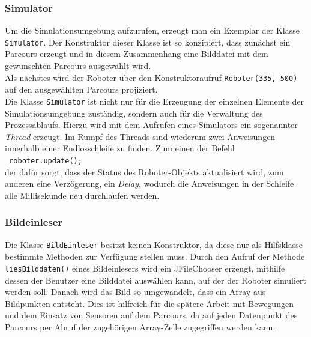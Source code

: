 \documentclass[paper=a4, DIV=calc, BCOR=12mm, twoside=on, onecolumn=on, open = right, titlepage =on, parskip =half-, headsepline = on, footsepline = off, chapterprefix = off, appendixprefix = on, fontsize = 12pt, numbers = noenddot, abstract = on]{scrbook}
\begin{document}
\vspace*{-2ex}
\subsubsection{Simulator}

Um die Simulationsumgebung aufzurufen, erzeugt man ein Exemplar der Klasse \texttt{Si\-mu\-la\-tor}. Der Konstruktor dieser Klasse ist so konzipiert, dass zunächst ein Parcours erzeugt und in diesem Zusammenhang eine Bilddatei mit dem gewünschten Parcours ausgewählt wird.\\
Als nächstes wird der Roboter über den Konstruktoraufruf \texttt{Roboter(335, 500)} auf den ausgewählten Parcours projiziert.\\
Die Klasse \texttt{Simulator} ist nicht nur für die Erzeugung der einzelnen Elemente der Simulationsumgebung zuständig, sondern auch für die Verwaltung des Prozessablaufs. Hierzu wird mit dem Aufrufen eines Simulators ein sogenannter \emph{Thread} erzeugt. Im Rumpf des Threads sind wiederum zwei Anweisungen innerhalb einer Endlosschleife zu finden. Zum einen der Befehl\\
\hspace*{2em} \texttt{{\_}roboter.update();}\\
der dafür sorgt, dass der Status des Roboter-Objekts aktualisiert wird, zum anderen eine Verzögerung, ein \emph{Delay}, wodurch die Anweisungen in der Schleife alle Millisekunde neu durchlaufen werden. 


\subsubsection{Bildeinleser}
Die Klasse \texttt{BildEinleser} besitzt keinen Konstruktor, da diese nur als Hilfsklasse bestimmte Methoden zur Verfügung stellen muss. Durch den Aufruf der Methode\\
\texttt{liesBilddaten()} eines Bildeinlesers wird ein JFileChooser erzeugt, mithilfe dessen der Benutzer eine Bilddatei auswählen kann, auf der der Roboter simuliert werden soll. Danach wird das Bild so umgewandelt, dass ein Array aus Bildpunkten entsteht. Dies ist hilfreich für die spätere Arbeit mit Bewegungen und dem Einsatz von Sensoren auf dem Parcours, da auf jeden Datenpunkt des Parcours per Abruf der zugehörigen Array-Zelle zugegriffen werden kann.
\end{document}
